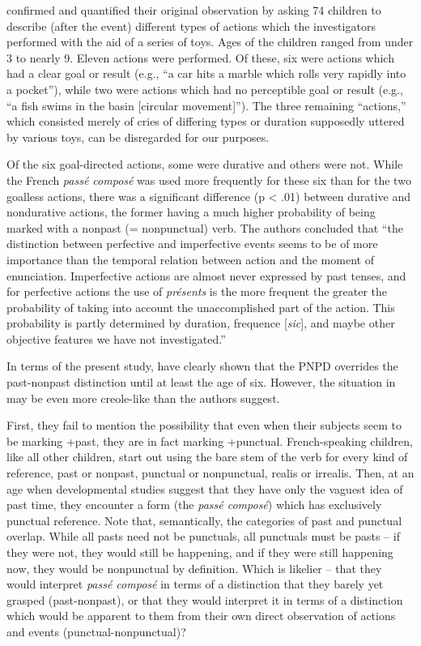 \citeauthor{BrockartEtAl1973} confirmed and quantified their original observation by asking 74 children to describe (after the event) different types of actions which the investigators performed with the aid of a series of toys. Ages of the children ranged from under 3 to nearly 9. Eleven actions were performed. Of these, six were actions which had a clear goal or result (e.g., ``a car hits a marble which rolls very rapidly into a pocket''), while two were actions which had no perceptible goal or result (e.g., ``a fish swims in the basin [circular movement]''). The three remaining ``actions,'' which consisted merely of cries of differing types or duration supposedly uttered by various toys, can be disregarded for our purposes.

Of the six goal-directed actions, some were durative and others were not. While the French \textit{pass\'e compos\'e} was used more frequently for these six than for the two goalless actions, there was a significant difference (p {\textless} .01) between durative and nondurative actions, the former having a much higher probability of being marked with a nonpast (= nonpunctual) verb. The authors concluded that ``the distinction between perfective and imperfective events seems to be of more importance than the temporal relation between action and the moment of enunciation. Imperfective actions are almost never ex\-pressed by past tenses, and for perfective actions the use of \textit{pr\'esents} is the more frequent the greater the probability of taking into account the unaccomplished part of the action. This probability is partly determined by duration, frequence [\textit{sic}], and maybe other objective features we have not investigated.''


In terms of the present study, \citeauthor{BrockartEtAl1973} have clearly shown that the PNPD overrides the past-nonpast distinction until at least the age of six. However, the situation in  may be even more creole-like than the authors suggest.

First, they fail to mention the possibility that even when their subjects seem to be marking +past, they are in fact marking +punctual. French-speaking children, like all other children, start out using the bare stem of the verb for every kind of reference, past or nonpast, punctual or nonpunctual, realis or irrealis. Then, at an age when devel\-opmental studies suggest that they have only the vaguest idea of past time, they encounter a form (the \textit{pass\'e compos\'e}) which has exclusively punctual reference. Note that, semantically, the categories of past and punctual overlap. While all pasts need not be punctuals, all punctuals must be pasts -- if they were not, they would still be happening, and if they were still happening now, they would be nonpunctual by defini\-tion. Which is likelier -- that they would interpret \textit{pass\'e compos\'e} in terms of a distinction that they barely yet grasped (past-nonpast), or that they would interpret it in terms of a distinction which would be apparent to them from their own direct observation of actions and events (punctual-nonpunctual)?

